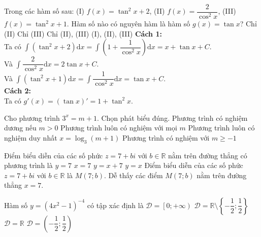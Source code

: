 \begin{ex}%
Trong các hàm số sau: (I) $f(x)=\tan^2x+2$, (II) $f(x)=\dfrac{2}{\cos^2x}$, (III) $f(x)=\tan^2x+1$. Hàm số nào có nguyên hàm là hàm số $g(x)=\tan x$?
\choice
{Chỉ (II)}
{\True Chỉ (III)}
{Chỉ (II), (III)}
{(I), (II), (III)}
\loigiai
{
\textbf{Cách 1:}\\
Ta có $\displaystyle\int\left(\tan^2x+2\right)\mathrm{d}x=\displaystyle\int\left(1+\dfrac{1}{\cos^2x}\right)\mathrm{d}x=x+\tan x+C$.\\Và $\displaystyle\int\dfrac{2}{\cos^2x}\mathrm{d}x=2\tan x+C$.\\Và $\displaystyle\int\left(\tan^2x+1\right)\mathrm{d}x=\displaystyle\int\dfrac{1}{\cos^2x}\mathrm{d}x=\tan x+C$.\\
\textbf{Cách 2:}\\ 
Ta có $g'(x)=\left(\tan x\right)'=1+\tan^2x$.
}
\end{ex}

\begin{ex}%
Cho phương trình $3^x=m+1$. Chọn phát biểu đúng.
\choice
{\True Phương trình có nghiệm dương nếu $m>0$}
{Phương trình luôn có nghiệm với mọi $m$}
{Phương trình luôn có nghiệm duy nhất $x=\log_3(m+1)$}
{Phương trình có nghiệm với $m\geq -1$}
\end{ex}

\begin{ex}%
Điểm biểu diễn của các số phức $z=7+bi$ với $b\in\mathbb{R}$ nằm trên đường thẳng có phương trình là
\choice
{$y=7$}
{\True $x=7$}
{$y=x+7$}
{$y=x$}
\loigiai
{Điểm biểu diễn của các số phức $z=7+bi$ với $b\in\mathbb{R}$ là $M(7; b)$. Dễ thấy các điểm $M(7; b)$ nằm trên đường thẳng $x=7$.}
\end{ex}

\begin{ex}%
Hàm số $y=\left(4x^2-1\right)^{-4}$ có tập xác định là
\choice
{$\mathscr{D}=\left[0;+\infty\right)$}
{\True $\mathscr{D}=\mathbb{R}\setminus\left\{-\dfrac{1}{2};\dfrac{1}{2}\right\}$}
{$\mathscr{D}=\mathbb{R}$}
{$\mathscr{D}=\left(-\dfrac{1}{2};\dfrac{1}{2}\right)$}
\end{ex}

